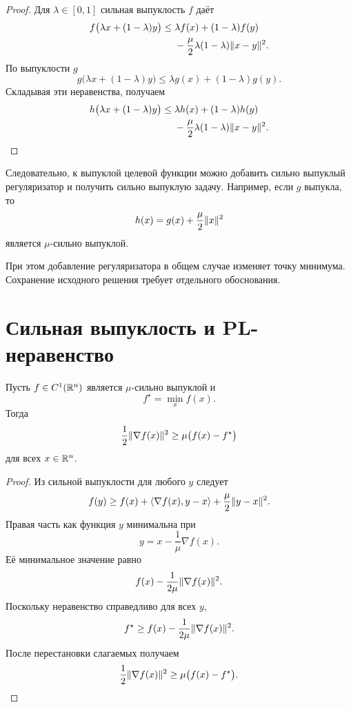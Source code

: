 \begin{proof}
Для \(\lambda\in[0,1]\) сильная выпуклость \(f\) даёт
\[
\begin{aligned}
    f\bigl(\lambda x+(1-\lambda)y\bigr)
    \le{}&
    \lambda f(x)+(1-\lambda)f(y)
    \\
    &-
    \frac{\mu}{2}
    \lambda(1-\lambda)\lVert x-y\rVert^2.
\end{aligned}
\]
По выпуклости \(g\)
\[
    g\bigl(\lambda x+(1-\lambda)y\bigr)
    \le
    \lambda g(x)+(1-\lambda)g(y).
\]
Складывая эти неравенства, получаем
\[
\begin{aligned}
    h\bigl(\lambda x+(1-\lambda)y\bigr)
    \le{}&
    \lambda h(x)+(1-\lambda)h(y)
    \\
    &-
    \frac{\mu}{2}
    \lambda(1-\lambda)\lVert x-y\rVert^2.
\end{aligned}
\]
\end{proof}

Следовательно, к выпуклой целевой функции можно добавить сильно
выпуклый регуляризатор и получить сильно выпуклую задачу. Например,
если \(g\) выпукла, то
\[
    h(x)=g(x)+\frac{\mu}{2}\lVert x\rVert^2
\]
является \(\mu\)-сильно выпуклой.

При этом добавление регуляризатора в общем случае изменяет точку
минимума. Сохранение исходного решения требует отдельного
обоснования.

\section{Сильная выпуклость и PL-неравенство}

\begin{theorem}
Пусть \(f\in C^1(\mathbb{R}^n)\) является \(\mu\)-сильно выпуклой и
\[
    f^\star=\min_x f(x).
\]
Тогда
\[
    \frac12\lVert\nabla f(x)\rVert^2
    \ge
    \mu\bigl(f(x)-f^\star\bigr)
\]
для всех \(x\in\mathbb{R}^n\).
\end{theorem}

\begin{proof}
Из сильной выпуклости для любого \(y\) следует
\[
    f(y)
    \ge
    f(x)
    +
    \left\langle \nabla f(x),y-x \right\rangle
    +
    \frac{\mu}{2}\lVert y-x\rVert^2.
\]
Правая часть как функция \(y\) минимальна при
\[
    y
    =
    x-\frac{1}{\mu}\nabla f(x).
\]
Её минимальное значение равно
\[
    f(x)
    -
    \frac{1}{2\mu}\lVert\nabla f(x)\rVert^2.
\]
Поскольку неравенство справедливо для всех \(y\),
\[
    f^\star
    \ge
    f(x)
    -
    \frac{1}{2\mu}\lVert\nabla f(x)\rVert^2.
\]
После перестановки слагаемых получаем
\[
    \frac12\lVert\nabla f(x)\rVert^2
    \ge
    \mu\bigl(f(x)-f^\star\bigr).
\]
\end{proof}

